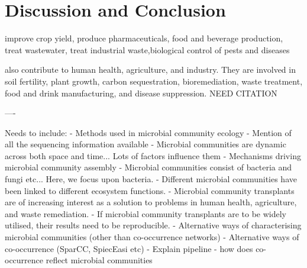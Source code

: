 \documentclass{article}
\begin{document}
\section{Discussion and Conclusion}

improve crop yield, produce pharmaceuticals, food and beverage production, treat wastewater, treat industrial waste,biological control of pests and diseases

also contribute to human health, agriculture, and industry. They are involved in soil fertility, plant growth, carbon sequestration, bioremediation, waste treatment, food and drink manufacturing, and disease suppression. NEED CITATION


----


Needs to include:
- Methods used in microbial community ecology
- Mention of all the sequencing information available
- Microbial communities are dynamic across both space and time... Lots of factors influence them
- Mechanisms driving microbial community assembly
- Microbial communities consist of bacteria and fungi etc... Here, we focus upon bacteria.
- Different microbial communities have been linked to different ecosystem functions.
- Microbial community transplants are of increasing interest as a solution to problems in human health, agriculture, and waste remediation.
- If microbial community transplants are to be widely utilised, their results need to be reproducible.
- Alternative ways of characterising microbial communities (other than co-occurrence networks)
- Alternative ways of co-occurrence (SparCC, SpiecEasi etc)
- Explain pipeline - how does co-occurrence reflect microbial communities



\end{document}
